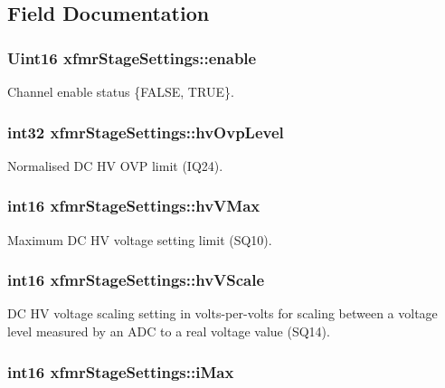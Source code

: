 \subsection{Field Documentation}
\hypertarget{a00010_aef5e40360d79d34e95c2b412d4e4063b}{
\subsubsection[{enable}]{\setlength{\rightskip}{0pt plus 5cm}Uint16 xfmr\-Stage\-Settings\-::enable}}\label{a00010_aef5e40360d79d34e95c2b412d4e4063b}
Channel enable status \{F\-A\-L\-S\-E, T\-R\-U\-E\}. \hypertarget{a00010_a311d7915ed53ed668964b7664df881c0}{
\subsubsection[{hv\-Ovp\-Level}]{\setlength{\rightskip}{0pt plus 5cm}int32 xfmr\-Stage\-Settings\-::hv\-Ovp\-Level}}\label{a00010_a311d7915ed53ed668964b7664df881c0}
Normalised D\-C H\-V O\-V\-P limit (I\-Q24). \hypertarget{a00010_a55b65a695862a846307f5131b1220cbe}{
\subsubsection[{hv\-V\-Max}]{\setlength{\rightskip}{0pt plus 5cm}int16 xfmr\-Stage\-Settings\-::hv\-V\-Max}}\label{a00010_a55b65a695862a846307f5131b1220cbe}
Maximum D\-C H\-V voltage setting limit (S\-Q10). \hypertarget{a00010_a3a22ae7b7c6bf805037d571fce3652b8}{
\subsubsection[{hv\-V\-Scale}]{\setlength{\rightskip}{0pt plus 5cm}int16 xfmr\-Stage\-Settings\-::hv\-V\-Scale}}\label{a00010_a3a22ae7b7c6bf805037d571fce3652b8}
D\-C H\-V voltage scaling setting in volts-\/per-\/volts for scaling between a voltage level measured by an A\-D\-C to a real voltage value (S\-Q14). \hypertarget{a00010_a7f041e2df9592fb461a013cdb67af348}{
\subsubsection[{i\-Max}]{\setlength{\rightskip}{0pt plus 5cm}int16 xfmr\-Stage\-Settings\-::i\-Max}}\label{a00010_a7f041e2df9592fb461a013cdb67af348}
